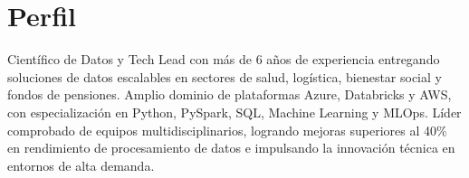 \section*{Perfil}
\noindent
Científico de Datos y Tech Lead con más de 6 años de experiencia entregando soluciones de datos escalables en sectores de salud, logística, bienestar social y fondos de pensiones. Amplio dominio de plataformas Azure, Databricks y AWS, con especialización en Python, PySpark, SQL, Machine Learning y MLOps. Líder comprobado de equipos multidisciplinarios, logrando mejoras superiores al 40\% en rendimiento de procesamiento de datos e impulsando la innovación técnica en entornos de alta demanda.
